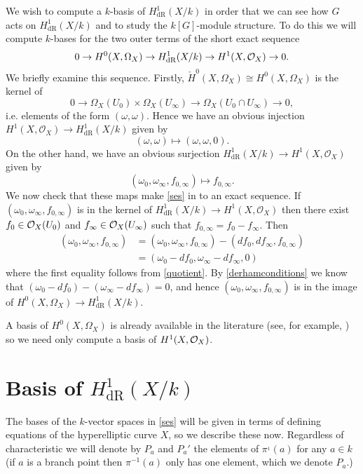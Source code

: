 \documentclass[draft, 11pt]{article} %
\theoremstyle{plain}
\theoremstyle{remark}
\newcommand{\cO}{{\cal O}}
\newcommand{\ra}{\rightarrow}
\newcommand{\hzero}{{H^0(X,\Omega_X)}}
\newcommand{\hone}{H^1(X,\mathcal{O}_X)}
\newcommand{\derhamhone}{H_{\text {dR}}^1(X/k)}
\newcommand{\cechhzero}{{\check{H}^0(X,\Omega_X)}}
\begin{document}
We wish to compute a $k$-basis of $\derhamhone$ in order that we can see how $G$ acts on $\derhamhone$ and to study the $k[G]$-module structure.
To do this we will compute $k$-bases for the two outer terms of the short exact sequence
\begin{equation}\label{ses}
0 \ra H^0(X,\Omega_X) \ra \derhamhone \ra H^1(X,\cO_X) \ra 0.
\end{equation}
We briefly examine this sequence.
Firstly, $\cechhzero \cong \hzero$ is the kernel of
\[
0 \ra \Omega_X(U_0) \times \Omega_X(U_\infty) \ra \Omega_X(U_0 \cap U_\infty ) \ra 0,
\]
i.e. elements of the form $(\omega, \omega)$.
Hence we have an obvious injection $\hone \ra \derhamhone$ given by
\[
(\omega, \omega) \mapsto (\omega, \omega, 0).
\]
On the other hand, we have an obvious surjection $\derhamhone \ra \hone$ given by
\[
(\omega_0, \omega_\infty, f_{0, \infty}) \mapsto f_{0, \infty}.
\]
We now check that these maps make \eqref{ses} in to an exact sequence.
If $(\omega_0, \omega_\infty, f_{0,\infty})$ is in the kernel of $\derhamhone \ra \hone$ then there exist $f_0 \in \cO_X(U_0)$ and $f_\infty \in \cO_X(U_\infty)$ such that $f_{0,\infty} = f_0 - f_\infty$.
Then 
\begin{align*}
(\omega_0 , \omega_\infty, f_{0, \infty}) & =  (\omega_0 , \omega_\infty, f_{0, \infty}) - (df_0, df_\infty, f_{0, \infty}) \\
& = (\omega_0 - df_0, \omega_\infty - df_\infty, 0)
\end{align*}
where the first equality follows from \eqref{quotient}.
By \eqref{derhamconditions} we know that $(\omega_0 - df_0)  - (\omega_\infty - df_\infty) = 0$,  and hence $(\omega_0, \omega_\infty, f_{0, \infty})$ is in the image of $\hzero \ra \derhamhone$.

A basis of $H^0(X,\Omega_X)$ is already available in the literature (see, for example, \cite[Prop. 7.4.26]{liu}) so we need only compute a basis of $H^1(X,\cO_X)$.

\section{Basis of $\derhamhone$}

The bases of the $k$-vector spaces in \eqref{ses} will be given in terms of defining equations of the hyperelliptic curve $X$, so we describe these now.
Regardless of characteristic we will denote by $P_a$ and $P_a'$ the elements of $\pi^{_1}(a)$ for any $a \in k$ (if $a$ is a branch point then $\pi^{-1}(a)$ only has one element, which we denote $P_a$.)
\end{document}
